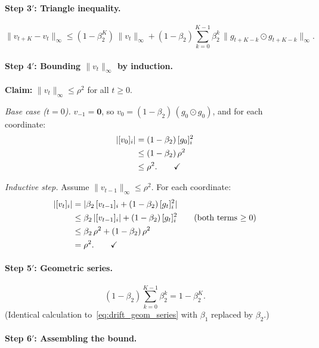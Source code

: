 \documentclass{article}
\begin{document}
\paragraph{Step 3$'$: Triangle inequality.}
\begin{equation}
\|v_{t+K} - v_t\|_\infty
\leq (1-\beta_2^K)\,\|v_t\|_\infty
+ (1-\beta_2)\sum_{k=0}^{K-1}\beta_2^k\,\|g_{t+K-k} \odot g_{t+K-k}\|_\infty.
\label{eq:drift_v_triangle}
\end{equation}

\paragraph{Step 4$'$: Bounding $\|v_t\|_\infty$ by induction.}

\noindent\textbf{Claim:} $\|v_t\|_\infty \leq \rho^2$ for all $t \geq 0$.

\emph{Base case ($t = 0$).}
$v_{-1} = \mathbf{0}$, so
$v_0 = (1-\beta_2)\,(g_0 \odot g_0)$, and for each coordinate:
\begin{align}
|[v_0]_i|
&= (1-\beta_2)\,[g_0]_i^2 \notag \\
&\leq (1-\beta_2)\,\rho^2 \notag \\
&\leq \rho^2. \qquad\checkmark
\label{eq:drift_v0_bound}
\end{align}

\emph{Inductive step.}
Assume $\|v_{t-1}\|_\infty \leq \rho^2$. For each coordinate:
\begin{align}
|[v_t]_i|
&= |\beta_2\,[v_{t-1}]_i + (1-\beta_2)\,[g_t]_i^2|
\notag \\
&\leq \beta_2\,|[v_{t-1}]_i| + (1-\beta_2)\,[g_t]_i^2
\qquad\text{(both terms $\geq 0$)}
\notag \\
&\leq \beta_2\,\rho^2 + (1-\beta_2)\,\rho^2
\notag \\
&= \rho^2. \qquad\checkmark
\label{eq:drift_v_induction}
\end{align}

\paragraph{Step 5$'$: Geometric series.}
\begin{equation}
(1-\beta_2)\sum_{k=0}^{K-1}\beta_2^k = 1 - \beta_2^K.
\label{eq:drift_v_geom}
\end{equation}
(Identical calculation to~\eqref{eq:drift_geom_series} with $\beta_1$
replaced by $\beta_2$.)

\paragraph{Step 6$'$: Assembling the bound.}
\end{document}
